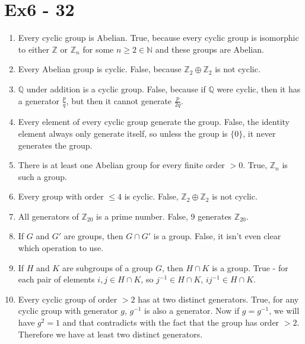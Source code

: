 \section*{Ex6 - 32}

\begin{enumerate}
    \item {Every cyclic group is Abelian. True, because every cyclic group is isomorphic to either $ \mathbb{Z} $ or $ \mathbb{Z}_n $ for some $ n \ge 2 \in \mathbb{N} $ and these groups are Abelian}.
    \item {Every Abelian group is cyclic. False, because $ \mathbb{Z}_2 \oplus \mathbb{Z}_2 $ is not cyclic.}
    \item {$ \mathbb{Q} $ under addition is a cyclic group. False, because if $ \mathbb{Q} $ were cyclic, then it has a generator $ \frac{p}{q} $, but then it cannot generate $ \frac{p}{2q} $.}
    \item {Every element of every cyclic group generate the group. False, the identity element always only generate itself, so unless the group is $ \{0\} $, it never generates the group.}
    \item {There is at least one Abelian group for every finite order $ > 0 $. True, $ \mathbb{Z}_n $ is such a group.}
    \item {Every group with order $ \le 4 $ is cyclic. False, $ \mathbb{Z}_2 \oplus \mathbb{Z}_2 $ is not cyclic.}
    \item {All generators of $ \mathbb{Z}_{20} $ is a prime number. False, 9 generates $ \mathbb{Z}_{20} $.}
    \item {If $ G $ and $ G' $ are groups, then $ G \cap G' $ is a group. False, it isn't even clear which operation to use.}
    \item {If $ H $ and $ K $ are subgroups of a group $ G $, then $ H \cap K $ is a group. True - for each pair of elements $ i, j \in H \cap K $, so $ j^{-1} \in H \cap K $, $ ij^{-1} \in H \cap K $.}
    \item {Every cyclic group of order $ > 2 $ has at two distinct generators. True, for any cyclic group with generator $ g $, $ g^{-1} $ is also a generator. Now if $ g = g^{-1} $, we will have $ g^2 = 1 $ and that contradicts with the fact that the group has order $ > 2 $. Therefore we have at least two distinct generators. }
\end{enumerate}